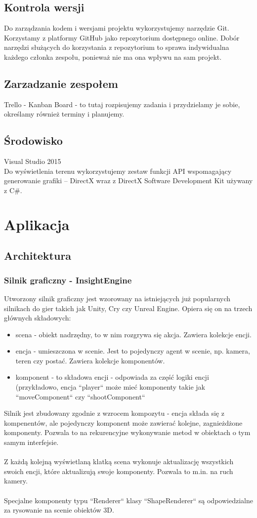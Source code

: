 \documentclass[12pt,a4paper]{article}
\begin{document}
\subsection{Kontrola wersji}
Do zarządzania kodem i wersjami projektu wykorzystujemy narzędzie Git. Korzystamy z platformy GitHub jako repozytorium dostępnego online. Dobór narzędzi służących do korzystania z repozytorium to sprawa indywidualna każdego członka zespołu, ponieważ nie ma ona wpływu na sam projekt.
\subsection{Zarzadzanie zespołem}
Trello - Kanban Board - to tutaj rozpisujemy zadania i przydzielamy je sobie, określamy również terminy i planujemy.
\subsection{Środowisko}
Visual Studio 2015 \\
Do wyświetlenia terenu wykorzystujemy zestaw funkcji API wspomagający generowanie grafiki – DirectX wraz z DirectX Software Development Kit używany z C\#.
\section{Aplikacja}
\subsection{Architektura}
\subsubsection{Silnik graficzny - InsightEngine}
Utworzony silnik graficzny jest wzorowany na istniejących już popularnych silnikach do gier takich jak Unity, Cry czy Unreal Engine. Opiera się on na trzech głównych składowych: \begin{itemize}
\item scena - obiekt nadrzędny, to w nim rozgrywa się akcja. Zawiera kolekcje encji.
\item encja - umieszczona w scenie. Jest to pojedynczy agent w scenie, np. kamera, teren czy postać. Zawiera kolekcje komponentów.
\item komponent - to składowa encji - odpowiada za część logiki encji (przykładowo, encja ``player`` może mieć komponenty takie jak ``moveComponent`` czy ``shootComponent``
\\
\end{itemize}
Silnik jest zbudowany zgodnie z wzrocem kompozytu - encja składa się z kompenentów, ale pojedynczy komponent może zawierać kolejne, zagnieżdżone komponenty. Pozwala to na rekurencyjne wykonywanie metod w obiektach o tym samym interfejsie. \\ \\
Z każdą kolejną wyświetlaną klatką scena wykonuje aktualizację wszystkich swoich encji, które aktualizują swoje komponenty. Pozwala to m.in. na ruch kamery. \\ \\
Specjalne komponenty typu ``Renderer`` klasy ``ShapeRenderer`` są odpowiedzialne za rysowanie na scenie obiektów 3D.
\end{document}
